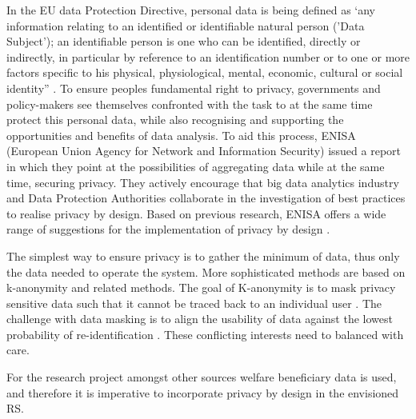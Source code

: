 In the EU data Protection Directive, personal data is being defined as ‘any information relating to an identified or identifiable natural person ('Data Subject'); an identifiable person is one who can be identified, directly or indirectly, in particular by reference to an identification number or to one or more factors specific to his physical, physiological, mental, economic, cultural or social identity” \cite{european_data_protection}. 
To ensure peoples fundamental right to privacy, governments and policy-makers see themselves confronted with the task to at the same time protect this personal data, while also recognising and supporting the opportunities and benefits of data analysis.
To aid this process, ENISA (European Union Agency for Network and Information Security) issued a report in which they point at the possibilities of aggregating data while at the same time, securing privacy. 
They actively encourage that big data analytics industry and Data Protection Authorities collaborate in the investigation of best practices to realise privacy by design. 
Based on previous research, ENISA offers a wide range of suggestions for the implementation of privacy by design \cite{d2015privacy}.

The simplest way to ensure privacy is to gather the minimum of data, thus only the data needed to operate the system. 
More sophisticated methods are based on k-anonymity and related methods. The goal of K-anonymity is to mask privacy sensitive data such that it cannot be traced back to an individual user \cite{sweeney2002k}. 
The challenge with data masking is to align the usability of data against the lowest probability of re-identification \cite{d2015privacy}. 
These conflicting interests need to balanced with care.

For the research project amongst other sources welfare beneficiary data is used, and therefore it is imperative to incorporate privacy by design in the envisioned RS. 



